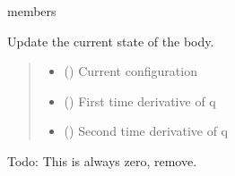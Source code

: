 \documentclass[letterpaper,10pt,english]{sphinxmanual}
\begin{document}
\begin{fulllineitems}
\begin{sphinxuseclass}{members}
\begin{description}
\begin{fulllineitems}
\begin{quote}
\begin{description}
\end{description}\end{quote}

\end{fulllineitems}


\begin{fulllineitems}
\label{\detokenize{body:Body.Update}}
\pysigstartsignatures
{}
\pysigstopsignatures
\sphinxAtStartPar
Update the current state of the body.
\begin{quote}\begin{description}
\begin{itemize}
\item {} 
\sphinxAtStartPar
{} () \textendash{} Current configuration

\item {} 
\sphinxAtStartPar
{} () \textendash{} First time derivative of q

\item {} 
\sphinxAtStartPar
{} () \textendash{} Second time derivative of q

\end{itemize}

\end{description}\end{quote}

\end{fulllineitems}


\begin{fulllineitems}
\label{\detokenize{body:Body.grad_int_dr}}
\pysigstartsignatures
{}
\pysigstopsignatures
\sphinxAtStartPar
Todo: This is always zero, remove.

\end{fulllineitems}



\end{description}
\end{sphinxuseclass}
\end{fulllineitems}
\end{document}
